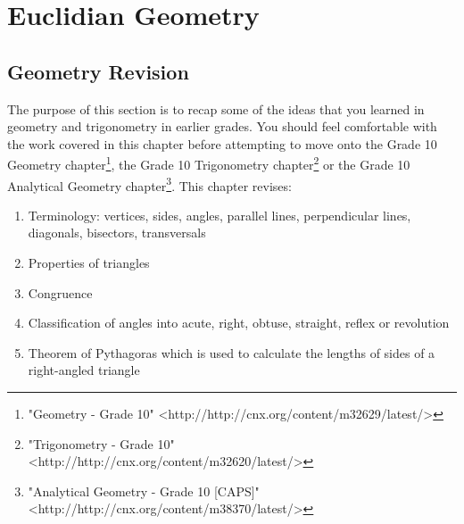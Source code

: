 \chapter{Euclidian Geometry}
\setcounter{figure}{1}
\setcounter{subfigure}{1}
\section{Geometry Revision}
\setcounter{figure}{1}
\setcounter{subfigure}{1}



The purpose of this section is to recap some of the ideas that you learned in geometry and trigonometry in earlier grades. You should feel comfortable with the work covered in this chapter before attempting to move onto the Grade 10 Geometry chapter\footnote{\raggedright{}"Geometry - Grade 10" <http://http://cnx.org/content/m32629/latest/>}, the Grade 10 Trigonometry chapter\footnote{\raggedright{}"Trigonometry - Grade 10" <http://http://cnx.org/content/m32620/latest/>} or the Grade 10 Analytical Geometry chapter\footnote{\raggedright{}"Analytical Geometry - Grade 10 [CAPS]" <http://http://cnx.org/content/m38370/latest/>}. This chapter revises:\par 
\begin{enumerate}[noitemsep, label=\textbf{\arabic*}. ] 
\item Terminology: vertices, sides, angles, parallel lines, perpendicular lines, diagonals, bisectors, transversals
\item Properties of triangles
\item Congruence
\item Classification of angles into acute, right, obtuse, straight, reflex or revolution
\item Theorem of Pythagoras which is used to calculate the lengths of sides of a right-angled triangle
\end{enumerate}

